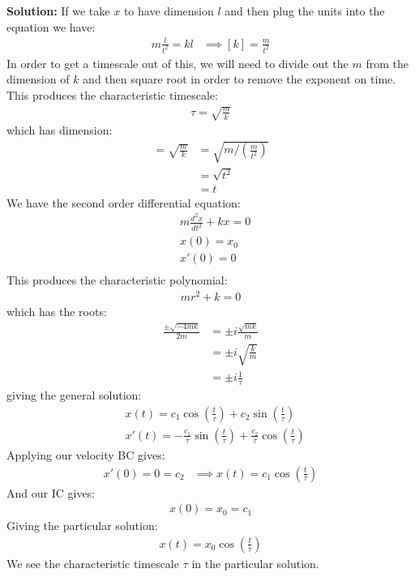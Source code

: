 {\color{red} {\bf Solution:}
If we take $x$ to have dimension $l$ and then plug the units into the equation we have:
\begin{align*}
    m \frac{l}{t^2} = k l &\implies [k] = \frac{m}{t^2}
\end{align*}
In order to get a timescale out of this, we will need to divide out the $m$ from the dimension of $k$ and  then square root in order to remove the exponent on time. This produces the characteristic timescale:
\begin{align*}
\tau = 
\sqrt{\frac{m}{k}}
\end{align*}
which has dimension:
\begin{align*}
   [\tau] = \sqrt{\frac{m}{k}} &= \sqrt{m/(\frac{m}{t^2})}\\
&= \sqrt{t^2}\\
&= t
\end{align*}
We have the second order differential equation:
\begin{align*}
    &m \frac{d^2 x}{dt^2} + kx = 0\\
    &x(0) = x_0\\
    &x'(0) = 0\\
\end{align*}
This produces the characteristic polynomial:
\begin{align*}
    mr^2 + k = 0
\end{align*}
which has the roots:
\begin{align*}
    \frac{\pm \sqrt{-4mk}}{2m} &= \pm i\frac{\sqrt{mk}}{m}\\
    &= \pm i \sqrt{\frac{k}{m}}\\
    &= \pm i \frac{1}{\tau}
\end{align*}
giving the general solution:
\begin{align*}
&x(t) = c_1 \cos(\frac{t}{\tau}) + c_2 \sin(\frac{t}{\tau})\\
&x'(t) = -\frac{c_1}{\tau} \sin(\frac{t}{\tau}) +  \frac{c_2}{\tau}\cos(\frac{t}{\tau})
\end{align*}
Applying our velocity BC gives:
\begin{align*}
    x'(0) = 0 = c_2 &\implies x(t) = c_1 \cos(\frac{t}{\tau})
\end{align*}
And our IC gives:
\begin{align*}
    x(0) = x_0 = c_1
\end{align*}
Giving the particular solution:
\begin{align*}
    x(t) = x_0 \cos(\frac{t}{\tau})
\end{align*}
We see the characteristic timescale $\tau$ in the particular solution.
}
